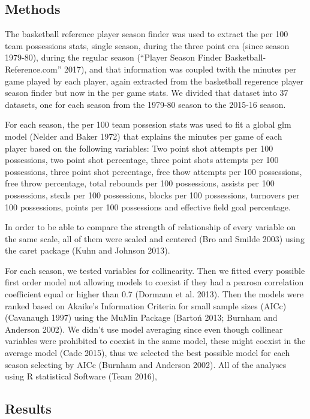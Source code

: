 \documentclass[]{elsarticle} %
\begin{document}
\subsection{Methods}\label{methods}

The basketball reference player season finder was used to extract the
per 100 team possessions stats, single season, during the three point
era (since season 1979-80), during the regular season (``Player Season
Finder Basketball-Reference.com'' 2017), and that information was
coupled twith the minutes per game played by each player, again
extracted from the basketball regerence player season finder but now in
the per game stats. We divided that dataset into 37 datasets, one for
each season from the 1979-80 season to the 2015-16 season.

For each season, the per 100 team possesion stats was used to fit a
global glm model (Nelder and Baker 1972) that explains the minutes per
game of each player based on the following variables: Two point shot
attempts per 100 possessions, two point shot percentage, three point
shots attempts per 100 possessions, three point shot percentage, free
thow attempts per 100 possessions, free throw percentage, total rebounds
per 100 possessions, assists per 100 possessions, steals per 100
possessions, blocks per 100 possessions, turnovers per 100 possessions,
points per 100 possessions and effective field goal percentage.

In order to be able to compare the strength of relationship of every
variable on the same scale, all of them were scaled and centered (Bro
and Smilde 2003) using the caret package (Kuhn and Johnson 2013).

For each season, we tested variables for collinearity. Then we fitted
every possible first order model not allowing models to coexist if they
had a pearosn correlation coefficient equal or higher than 0.7 (Dormann
et al. 2013). Then the models were ranked based on Akaike's Information
Criteria for small sample sizes (AICc) (Cavanaugh 1997) using the MuMin
Package (Barto{ń} 2013; Burnham and Anderson 2002). We didn't use model
averaging since even though collinear variables were prohibited to
coexist in the same model, these might coexist in the average model
(Cade 2015), thus we selected the best possible model for each season
selecting by AICc (Burnham and Anderson 2002). All of the analyses using
R statistical Software (Team 2016),

\subsection{Results}\label{results}
\end{document}
